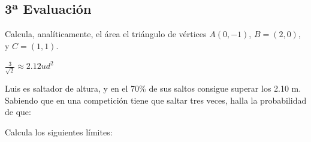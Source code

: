 \documentclass[addpoints,spanish, 12pt,a4paper]{exam}
\begin{document}
\begin{questions}
\section*{3ª Evaluación}    

\question[1] Calcula, analíticamente, el área el triángulo de vértices $A(0, -1)$,  $B=(2, 0)$,  y  $C=(1, 1)$.
\begin{solution}
$\frac{3}{\sqrt{2}}\approx2.12 ud^2$
\end{solution}

\question[1] Luis es saltador de altura, y en el 70\% de sus saltos consigue superar los 2.10 m. Sabiendo que en una competición tiene que saltar tres veces, halla la probabilidad de que:
\begin{multicols}{2}

\end{multicols}        
        
    
        \question[1] Calcula los siguientes límites: 
        \begin{multicols}{2}
\end{multicols}
\end{questions}
\end{document}
